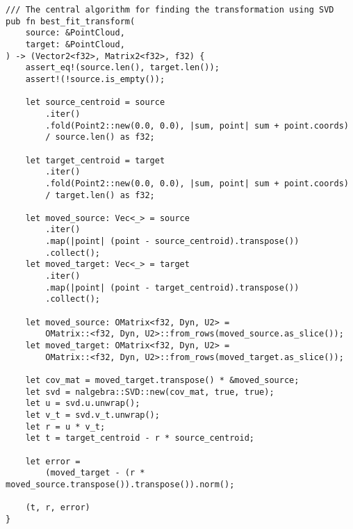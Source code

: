 \begin{lstlisting}
/// The central algorithm for finding the transformation using SVD
pub fn best_fit_transform(
    source: &PointCloud,
    target: &PointCloud,
) -> (Vector2<f32>, Matrix2<f32>, f32) {
    assert_eq!(source.len(), target.len());
    assert!(!source.is_empty());

    let source_centroid = source
        .iter()
        .fold(Point2::new(0.0, 0.0), |sum, point| sum + point.coords)
        / source.len() as f32;

    let target_centroid = target
        .iter()
        .fold(Point2::new(0.0, 0.0), |sum, point| sum + point.coords)
        / target.len() as f32;

    let moved_source: Vec<_> = source
        .iter()
        .map(|point| (point - source_centroid).transpose())
        .collect();
    let moved_target: Vec<_> = target
        .iter()
        .map(|point| (point - target_centroid).transpose())
        .collect();

    let moved_source: OMatrix<f32, Dyn, U2> =
        OMatrix::<f32, Dyn, U2>::from_rows(moved_source.as_slice());
    let moved_target: OMatrix<f32, Dyn, U2> =
        OMatrix::<f32, Dyn, U2>::from_rows(moved_target.as_slice());

    let cov_mat = moved_target.transpose() * &moved_source;
    let svd = nalgebra::SVD::new(cov_mat, true, true);
    let u = svd.u.unwrap();
    let v_t = svd.v_t.unwrap();
    let r = u * v_t;
    let t = target_centroid - r * source_centroid;

    let error =
        (moved_target - (r * moved_source.transpose()).transpose()).norm();

    (t, r, error)
}
\end{lstlisting}
